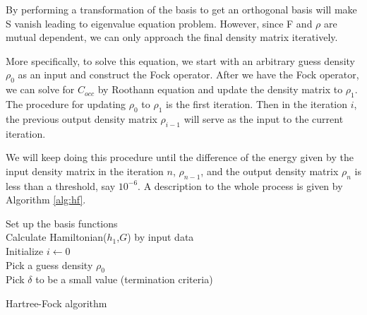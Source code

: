 \documentclass[twoside]{article}
\begin{document}
By performing a transformation of the basis to get an orthogonal basis will make S vanish leading to eigenvalue
equation problem. However, since F and $\rho$ are mutual dependent, we can only approach the final density matrix iteratively.

More specifically, to solve this equation, we start with an arbitrary guess density $\rho_0$ as an input and construct the Fock operator. 
After we have the Fock operator, we can solve for $C_{occ}$ by Roothann equation and update the density matrix to $\rho_1$. The procedure for updating $\rho_0$ to $\rho_1$ is the first iteration. Then in the iteration $i$, the previous output density matrix $\rho_{i-1}$ will serve as the input to the current iteration.

We will keep doing this procedure until the difference of the energy given by the input density matrix in the iteration $n$, $\rho_{n-1}$,  and the output density matrix $\rho_n$ is less than a threshold, say $10^{-6}$.  A description to the whole process is given by Algorithm \ref{alg:hf}.





\begin{algorithm}[htb]
 \label{alg:hf}
	Set up the basis functions\\
	Calculate Hamiltonian($h_1$,$G$) by input data  \\
	Initialize $i \leftarrow	 0$ \\	
	Pick a guess density $\rho_0$ \\
	Pick $\delta$ to be a small value (termination criteria) \\
 \caption{Hartree-Fock algorithm}
\end{algorithm}
\end{document}
